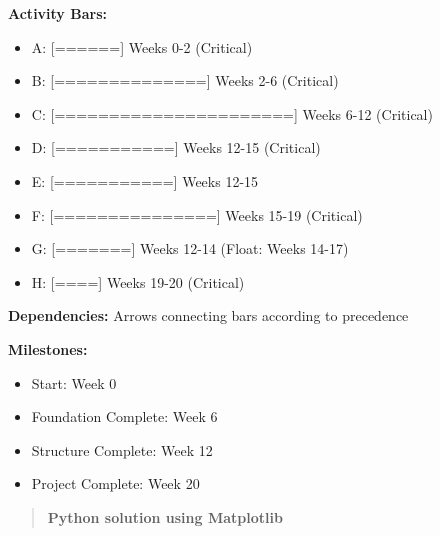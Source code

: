 \documentclass[
  letterpaper,
  DIV=11,
  numbers=noendperiod]{scrreprt}
\providecommand{\tightlist}{%
  \setlength{\itemsep}{0pt}\setlength{\parskip}{0pt}}
\begin{document}
\textbf{Activity Bars:}

\begin{itemize}
\tightlist
\item
  A: {[}======{]} Weeks 0-2 (Critical)
\item
  B: {[}=============={]} Weeks 2-6 (Critical)
\item
  C: {[}======================{]} Weeks 6-12 (Critical)
\item
  D: {[}==========={]} Weeks 12-15 (Critical)
\item
  E: {[}==========={]} Weeks 12-15
\item
  F: {[}==============={]} Weeks 15-19 (Critical)
\item
  G: {[}======={]} Weeks 12-14 (Float: Weeks 14-17)
\item
  H: {[}===={]} Weeks 19-20 (Critical)
\end{itemize}

\textbf{Dependencies:} Arrows connecting bars according to precedence

\textbf{Milestones:}

\begin{itemize}
\tightlist
\item
  Start: Week 0
\item
  Foundation Complete: Week 6
\item
  Structure Complete: Week 12
\item
  Project Complete: Week 20
\end{itemize}

\begin{quote}
\textbf{Python solution using Matplotlib}
\end{quote}
\end{document}
